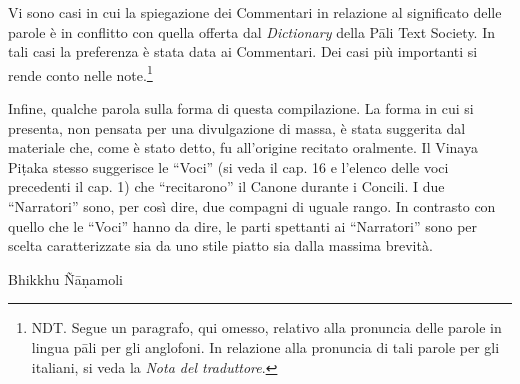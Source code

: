 Vi sono casi in cui la spiegazione dei Commentari in relazione al
significato delle parole è in conflitto con quella offerta dal
\emph{Dictionary} della Pāli Text Society. In tali casi la preferenza è stata
data ai Commentari. Dei casi più importanti si rende conto nelle
note.\footnote{NDT. Segue un paragrafo, qui omesso, relativo alla pronuncia delle parole in lingua pāli per gli anglofoni. In relazione alla pronuncia di tali parole per gli italiani, si veda la \emph{Nota del traduttore}.}

Infine, qualche parola sulla forma di questa compilazione. La forma in
cui si presenta, non pensata per una divulgazione di massa, è stata
suggerita dal materiale che, come è stato detto, fu all’origine recitato
oralmente. Il Vinaya Piṭaka stesso suggerisce le “Voci” (si veda il cap.
16 e l’elenco delle voci precedenti il cap. 1) che “recitarono” il
Canone durante i Concili. I due “Narratori” sono, per così dire, due
compagni di uguale rango. In contrasto con quello che le “Voci” hanno da
dire, le parti spettanti ai “Narratori” sono per scelta caratterizzate
sia da uno stile piatto sia dalla massima brevità.

\bigskip

{\raggedleft
Bhikkhu Ñāṇamoli
\par}

